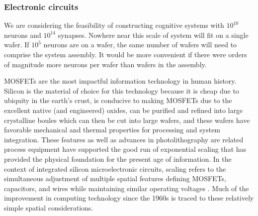 \documentclass[twocolumn]{article}
\begin{document}
\subsubsection{Electronic circuits}
We are considering the feasibility of constructing cognitive systems with $10^{10}$ neurons and $10^{14}$ synapses. Nowhere near this scale of system will fit on a single wafer. If $10^5$ neurons are on a wafer, the same number of wafers will need to comprise the system assembly. It would be more convenient if there were orders of magnitude more neurons per wafer than wafers in the assembly.

MOSFETs are the most impactful information technology in human history. Silicon is the material of choice for this technology because it is cheap due to ubiquity in the earth's crust, is conducive to making MOSFETs due to the excellent native (and engineered) oxides, can be purified and refined into large crystalline boules which can then be cut into large wafers, and these wafers have favorable mechanical and thermal properties for processing and system integration. These features as well as advances in photolithography are related process equipment have supported the good run of exponential scaling \cite{} that has provided the physical foundation for the present age of information. In the context of integrated silicon microelectronic circuits, scaling refers to the simultaneous adjustment of multiple spatial features defining MOSFETs, capacitors, and wires while maintaining similar operating voltages \cite{Keyes}. Much of the improvement in computing technology since the 1960s is traced to these relatively simple spatial considerations. 
\end{document}
